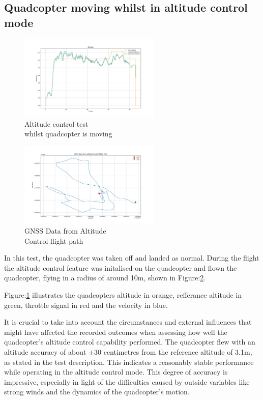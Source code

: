 \documentclass{report}
\begin{document}
\subsection*{Quadcopter moving whilst in altitude control mode}
\begin{figure}[H]
    \centering
    \includegraphics[width=0.6\textwidth]{Pictures/Altitude_hold_test_moving.png}
    \captionsetup{justification=centering}
    \caption{Altitude control test \\ whilst quadcopter is moving}
    \label{fig:Altitude_hold_test_moving}
\end{figure}
\begin{figure}[H]
    \centering
    \includegraphics[width=0.6\textwidth]{Pictures/GNSS_Altitude_hold_test_moving.png}
    \captionsetup{justification=centering}
    \caption{GNSS Data from Altitude \\ Control flight path}
    \label{fig:GNSS_Altitude_hold_test_moving_gps}
\end{figure}
In this test, the quadcopter was taken off and landed as normal. During the
flight the altitude control feature was initalised on the quadcopter and flown
the quadcopter, flying in a radius of around 10m, shown in
Figure:\ref{fig:GNSS_Altitude_hold_test_moving_gps}.

Figure:\ref{fig:Altitude_hold_test_moving} illustrates the quadcopters
altitude in orange, refferance altitude in green, throttle signal in red and the
velocity in blue.

It is crucial to take into account the circumstances and external influences
that might have affected the recorded outcomes when assessing how well the
quadcopter's altitude control capability performed. The quadcopter flew with an
altitude accuracy of about \(\pm30\) centimetres from the reference altitude of
3.1m, as stated in the test description. This indicates a reasonably stable
performance while operating in the altitude control mode. This degree of
accuracy is impressive, especially in light of the difficulties caused by
outside variables like strong winds and the dynamics of the quadcopter's motion.
\end{document}
